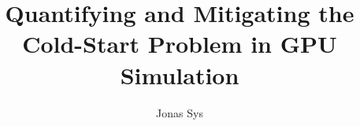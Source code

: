 \documentclass[11pt]{ugent2016-report}
\author{Jonas Sys}
\title{Quantifying and Mitigating the Cold-Start Problem in GPU Simulation}
\begin{document}
    \maketitle
    
    \tableofcontents

    
    
    
    
    
    
    
    \cite{sieve} %
    
    
\end{document}
